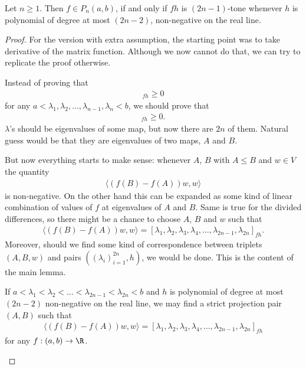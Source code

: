 \begin{lause}\label{main_theorem}
	Let $n \geq 1$. Then $f \in P_{n}(a, b)$, if and only if $f h$ is $(2 n - 1)$-tone whenever $h$ is polynomial of degree at most $(2 n - 2)$, non-negative on the real line. 
\end{lause}
\begin{proof}
	For the version with extra assumption, the starting point was to take derivative of the matrix function. Although we now cannot do that, we can try to replicate the proof otherwise.

	Instead of proving that
	\begin{align*}
		[\lambda_{1}, \lambda_{1}, \lambda_{2}, \lambda_{2}, \ldots, \lambda_{n}, \lambda_{n}]_{f h} \geq 0
	\end{align*}
	for any $a < \lambda_{1}, \lambda_{2}, \ldots, \lambda_{n - 1}, \lambda_{n} < b$, we should prove that
	\begin{align*}
		[\lambda_{1}, \lambda_{2}, \lambda_{3}, \lambda_{4}, \ldots, \lambda_{2n - 1}, \lambda_{2 n}]_{f h} \geq 0.
	\end{align*}
	$\lambda$'s should be eigenvalues of some map, but now there are $2 n$ of them. Natural guess would be that they are eigenvalues of two maps, $A$ and $B$.

	But now everything starts to make sense: whenever $A$, $B$ with $A \leq B$ and $w \in V$ the quantity
	\begin{align*}
		\langle (f(B) - f(A)) w, w \rangle
	\end{align*}
	is non-negative. On the other hand this can be expanded as some kind of linear combination of values of $f$ at eigenvalues of $A$ and $B$. Same is true for the divided differences, so there might be a chance to choose $A$, $B$ and $w$ such that
	\begin{align*}
		\langle (f(B) - f(A)) w, w \rangle = [\lambda_{1}, \lambda_{2}, \lambda_{3}, \lambda_{4}, \ldots, \lambda_{2n - 1}, \lambda_{2 n}]_{f h}.
	\end{align*}
	Moreover, should we find some kind of correspondence between triplets $(A, B, w)$ and pairs $((\lambda_{i})_{i = 1}^{2 n}, h)$, we would be done. This is the content of the main lemma.

	\begin{lem}\label{main_lemma}
		If $a < \lambda_{1} < \lambda_{2} < \ldots < \lambda_{2 n - 1} < \lambda_{2 n} < b$ and $h$ is polynomial of degree at most $(2 n - 2)$ non-negative on the real line, we may find a strict projection pair $(A, B)$ such that
		\begin{align*}
			\langle (f(B) - f(A)) w, w \rangle = [\lambda_{1}, \lambda_{2}, \lambda_{3}, \lambda_{4}, \ldots, \lambda_{2n - 1}, \lambda_{2 n}]_{f h}
		\end{align*}
		for any $f : (a, b) \to \R$.


\end{lem}
\end{proof}
